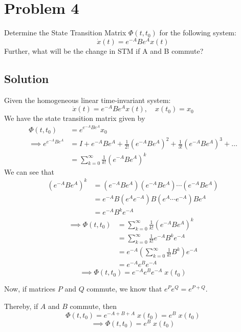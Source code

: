 \section*{Problem 4}

Determine the State Transition Matrix \( \Phi(t,t_0) \) for the following system:
\begin{equation*}
    \dot x(t)
    =
    e^{-A} B e^A x(t)
\end{equation*}
Further, what will be the change in STM if A and B commute?

\subsection*{Solution}

Given the homogeneous linear time-invariant system:
\begin{equation*}
    \dot{x}(t) = e^{-A} B e^A x(t),
    \quad
    x(t_0) = x_0
\end{equation*}
We have the state transition matrix given by
\begin{align*}
    \Phi(t, t_0)
     & =
    e^{e^{-A} B e^A} x_0
    \\
    \implies
    e^{e^{-A} B e^A}
     & =
    I + e^{-A} B e^A + \frac{1}{2!} {(e^{-A} B e^A)}^2 + \frac{1}{3!} {(e^{-A} B e^A)}^3 + \ldots
    \\ & =
    \sum_{k=0}^{\infty} \frac{1}{k!} {(e^{-A} B e^A)}^k
\end{align*}
We can see that
\begin{align*}
    {(e^{-A} B e^A)}^k
     & =
    (e^{-A} B e^A)
    (e^{-A} B e^A)
    \cdots
    (e^{-A} B e^A)
    \\ & =
    e^{-A} B (e^A
    e^{-A}) B (e^A
    \cdots
    e^{-A}) B e^A
    \\ & =
    e^{-A} B^k e^{-A}
\end{align*}
\begin{align*}
    \implies
    \Phi(t, t_0)
     & =
    \sum_{k=0}^{\infty} \frac{1}{k!} {(e^{-A} B e^A)}^k
    \\ & =
    \sum_{k=0}^{\infty} \frac{1}{k!} e^{-A} B^k e^{-A}
    \\ & =
    e^{-A} \left( \sum_{k=0}^{\infty} \frac{1}{k!} B^k \right) e^{-A}
    \\ & =
    e^{-A} e^{B} e^{-A}
\end{align*}
\begin{equation*}
    \implies
    \boxed{
        \Phi(t, t_0)
        =
        e^{-A} e^{B} e^{-A} \; x(t_0)
    }
\end{equation*}

Now, if matrices \( P \) and \( Q \) commute, we know that \( e^P e^Q = e^{P + Q} \).

Thereby, if \( A \) and \( B \) commute, then
\begin{equation*}
    \Phi(t, t_0)
    =
    e^{-A + B + A} \; x(t_0)
    =
    e^{B} \; x(t_0)
\end{equation*}
\begin{equation*}
    \implies
    \boxed{
        \Phi(t, t_0)
        =
        e^{B} \; x(t_0)
    }
\end{equation*}
